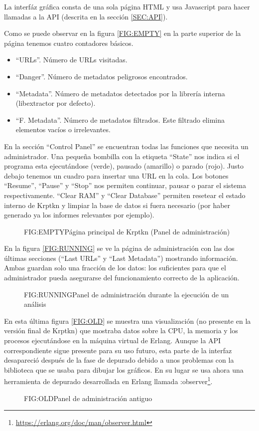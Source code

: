 La interfáz gráfica consta de una sola página HTML y usa Javascript para hacer llamadas a la API (descrita en la sección \ref{SEC:API}).

Como se puede observar en la figura \ref{FIG:EMPTY} en la parte superior de la página tenemos cuatro contadores básicos.

\begin{itemize}
  \item ``URLs''. Número de URLs visitadas.
  \item ``Danger''. Número de metadatos peligrosos encontrados.
  \item ``Metadata''. Número de metadatos detectados por la librería interna (libextractor por defecto).
  \item ``F. Metadata''. Número de metadatos filtrados. Este filtrado elimina elementos vacíos o irrelevantes.
\end{itemize}

En la sección ``Control Panel'' se encuentran todas las funciones que necesita un administrador. Una pequeña bombilla con la etiqueta ``State'' nos indica si el programa esta ejecutándose (verde), pausado (amarillo) o parado (rojo). Justo debajo tenemos un cuadro para insertar una URL en la cola. Los botones ``Resume'', ``Pause'' y ``Stop'' nos permiten continuar, pausar o parar el sistema respectivamente. ``Clear RAM'' y ``Clear Database'' permiten resetear el estado interno de Krptkn y limpiar la base de datos si fuera necesario (por haber generado ya los informes relevantes por ejemplo).

\begin{figure}[emtpy]{FIG:EMPTY}{Página principal de Krptkn (Panel de administración)}
\end{figure}

En la figura \ref{FIG:RUNNING} se ve la página de administración con las dos últimas secciones (``Last URLs'' y ``Last Metadata'') mostrando información. Ambas guardan solo una fracción de los datos: los suficientes para que el administrador pueda asegurarse del funcionamiento correcto de la aplicación.

\begin{figure}[running]{FIG:RUNNING}{Panel de administración durante la ejecución de un análisis}
\end{figure}

En esta última figura \ref{FIG:OLD} se muestra una visualización (no presente en la versión final de Krptkn) que mostraba datos sobre la CPU, la memoria y los procesos ejecutándose en la máquina virtual de Erlang. Aunque la API correspondiente sigue presente para su uso futuro, esta parte de la interfaz desapareció después de la fase de depurado debido a unos problemas con la biblioteca que se usaba para dibujar los gráficos. En su lugar se usa ahora una herramienta de depurado desarrollada en Erlang llamada :observer\footnote{\url{https://erlang.org/doc/man/observer.html}}.

\begin{figure}[old]{FIG:OLD}{Panel de administración antiguo}
\end{figure}